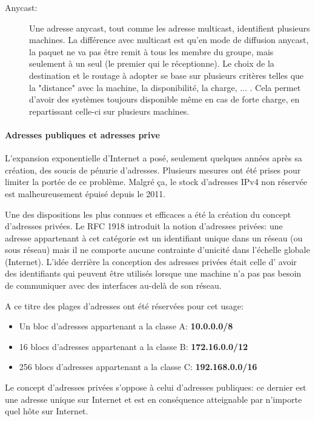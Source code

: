 \begin{description}
\item[Anycast:] Une adresse anycast, tout comme les adresse multicast,
identifient plusieurs machines. La différence avec multicast est qu'en mode de
diffusion anycast, la paquet ne va pas être remit à tous les membre du groupe,
mais seulement à un seul (le premier qui le réceptionne).  Le choix de la
destination et le routage à adopter se base sur plusieurs critères telles que
la "distance" avec la machine, la disponibilité, la charge, ... . Cela permet
d'avoir des systèmes toujours disponible même en cas de forte charge, en
repartissant celle-ci sur plusieurs machines.

\end{description}



\paragraph{Adresses publiques et adresses prive}
L'expansion exponentielle d'Internet a posé, seulement quelques années après sa
création, des soucis de pénurie d'adresses. Plusieurs mesures ont été prises
pour limiter la portée de ce problème. Malgré ça, le stock d'adresses IPv4 non
réservée est malheureusement épuisé depuis le 2011.

Une des dispositions les plus connues et efficaces a été la création du concept
d'adresses privées. Le RFC 1918 introduit la notion d'adresses privées: une adresse
appartenant à cet catégorie est un identifiant unique dans un réseau (ou sous
réseau) mais il ne comporte aucune contrainte d'unicité dans l'échelle globale
(Internet). L'idée derrière la conception des adresses privées était celle d'
avoir des identifiants qui peuvent être utilisés lorsque une machine n'a pas
pas besoin de communiquer avec des interfaces au-delà de son réseau.

A ce titre des plages d'adresses ont été réservées pour cet usage:

\begin{itemize}
\item Un bloc d'adresses appartenant a la classe A: \textbf{10.0.0.0/8}
\item 16 blocs d'adresses appartenant a la classe B: \textbf{172.16.0.0/12}
\item 256 blocs d'adresses appartenant a la classe C: \textbf{192.168.0.0/16}
\end{itemize}

\smallbreak
Le concept d'adresses privées s'oppose à celui d'adresses publiques: ce dernier est 
une adresse unique sur Internet et est en conséquence atteignable par n'importe
quel hôte sur Internet.

